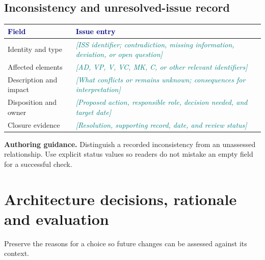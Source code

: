 \documentclass[11pt,letterpaper]{article}
\newcommand{\TemplatePageBreak}{\clearpage}
\newcommand{\FillIn}[1]{\textcolor{Teal}{\sffamily\itshape[#1]}}
\newcommand{\TableHead}[1]{\textcolor{Navy}{\sffamily\bfseries#1}}
\newcommand{\Lead}[1]{\textcolor{Muted}{#1}\par\vspace{3pt}}
\newcommand{\Guide}[1]{\par{\small\textcolor{Muted}{\textbf{Authoring guidance.} #1}}\par}
\begin{document}
\subsection{Inconsistency and unresolved-issue record}
{\small
\begin{tabularx}{\linewidth}{@{}L{1.35in}Y@{}}
\toprule
\TableHead{Field} & \TableHead{Issue entry}\\
\midrule
Identity and type & \FillIn{ISS identifier; contradiction, missing information, deviation, or open question}\\
Affected elements & \FillIn{AD, VP, V, VC, MK, C, or other relevant identifiers}\\
Description and impact & \FillIn{What conflicts or remains unknown; consequences for interpretation}\\
Disposition and owner & \FillIn{Proposed action, responsible role, decision needed, and target date}\\
Closure evidence & \FillIn{Resolution, supporting record, date, and review status}\\
\bottomrule
\end{tabularx}}
\Guide{Distinguish a recorded inconsistency from an unassessed relationship.
Use explicit status values so readers do not mistake an empty field for a successful check.}

\TemplatePageBreak
\section{Architecture decisions, rationale and evaluation}
\Lead{Preserve the reasons for a choice so future changes can be assessed against its context.}
\end{document}
